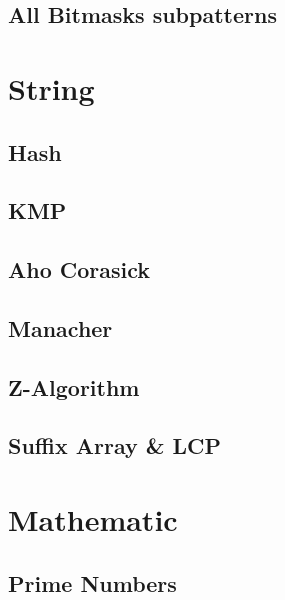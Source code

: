 \documentclass[10pt,a4paper]{report}
\begin{document}
	\section{All Bitmasks subpatterns}
		
		
\chapter{String}
	\section{Hash}
		
	\newpage
	\section{KMP}
		
	\newpage
	\section{Aho Corasick}
		
	\newpage
	\section{Manacher}
		
	\newpage
	\section{Z-Algorithm}
		
	\newpage
	\section{Suffix Array \& LCP}
		
	
\chapter{Mathematic}
	\section{Prime Numbers}
		\newpage
\end{document}
